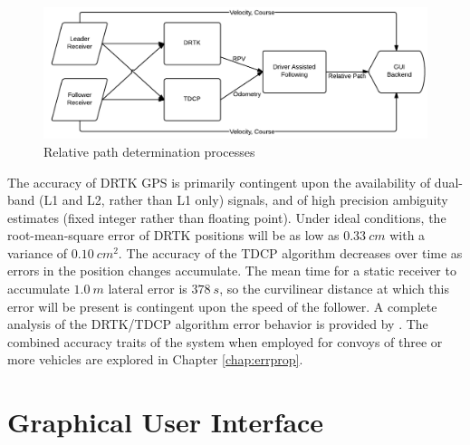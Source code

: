 \documentclass[12pt]{report}
\begin{document}
\begin{figure}[ht]
    \centering
    \includegraphics[width=6.5in]{./figs/data_algo.png}
    \caption{Relative path determination processes}
    \label{fig:drtktdcp}
\end{figure}

The accuracy of DRTK GPS is primarily contingent upon the availability of dual-band (L1 and L2, rather than L1 only) signals, and of high precision ambiguity estimates (fixed integer rather than floating point). Under ideal conditions, the root-mean-square error of DRTK positions will be as low as $0.33~cm$ with a variance of $0.10~cm^2$. 
The accuracy of the TDCP algorithm decreases over time as errors in the position changes accumulate. The mean time for a static receiver to accumulate $1.0~m$ lateral error is $378~s$, so the curvilinear distance at which this error will be present is contingent upon the speed of the follower. A complete analysis of the DRTK/TDCP algorithm error behavior is provided by \cite{scottthesis}. The combined accuracy traits of the system when employed for convoys of three or more vehicles are explored in Chapter \ref{chap:errprop}.





\chapter{Graphical User Interface} \label{chap:gui}

\end{document}

